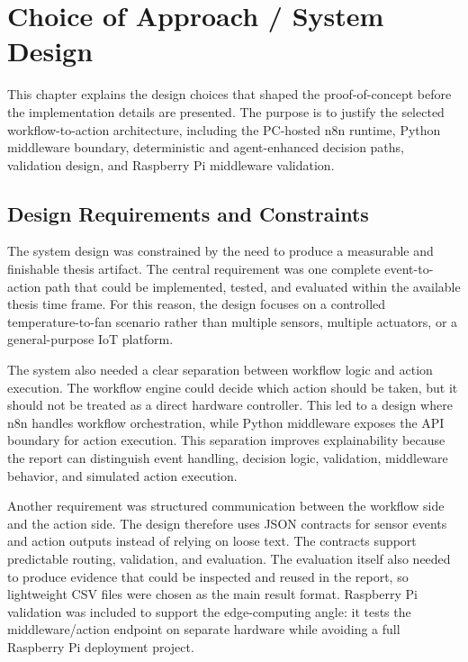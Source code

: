 \section{Choice of Approach / System Design}\label{sec:system-design}


This chapter explains the design choices that shaped the proof-of-concept before the implementation details are presented. The purpose is to justify the selected workflow-to-action architecture, including the PC-hosted n8n runtime, Python middleware boundary, deterministic and agent-enhanced decision paths, validation design, and Raspberry Pi middleware validation.

\subsection{Design Requirements and Constraints}\label{subsec:design-requirements-constraints}

The system design was constrained by the need to produce a measurable and finishable thesis artifact. The central requirement was one complete event-to-action path that could be implemented, tested, and evaluated within the available thesis time frame. For this reason, the design focuses on a controlled temperature-to-fan scenario rather than multiple sensors, multiple actuators, or a general-purpose IoT platform.

The system also needed a clear separation between workflow logic and action execution. The workflow engine could decide which action should be taken, but it should not be treated as a direct hardware controller. This led to a design where n8n handles workflow orchestration, while Python middleware exposes the API boundary for action execution. This separation improves explainability because the report can distinguish event handling, decision logic, validation, middleware behavior, and simulated action execution.

Another requirement was structured communication between the workflow side and the action side. The design therefore uses JSON contracts for sensor events and action outputs instead of relying on loose text. The contracts support predictable routing, validation, and evaluation. The evaluation itself also needed to produce evidence that could be inspected and reused in the report, so lightweight CSV files were chosen as the main result format. Raspberry Pi validation was included to support the edge-computing angle: it tests the middleware/action endpoint on separate hardware while avoiding a full Raspberry Pi deployment project.

